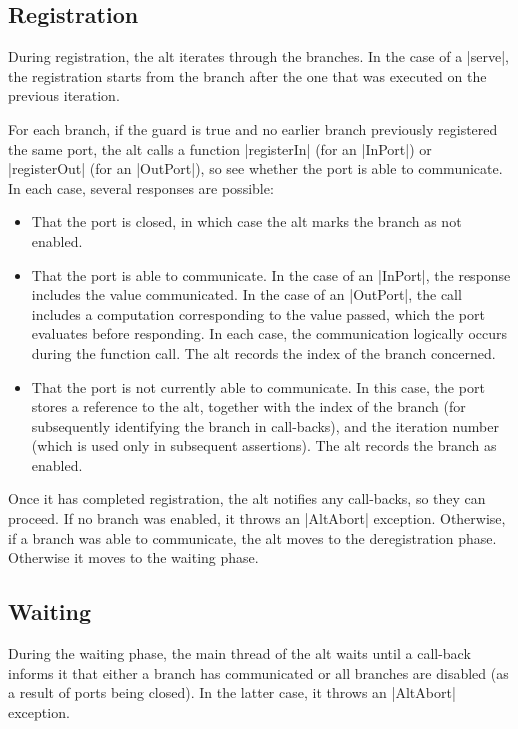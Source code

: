 \documentclass[12pt,a4paper]{article}
\begin{document}

\subsection*{Registration}

During registration, the alt iterates through the branches.  In the case of a
|serve|, the registration starts from the branch after the one that was
executed on the previous iteration. 

For each branch, if the guard is true and no earlier branch previously
registered the same port, the alt calls a function |registerIn| (for an
|InPort|) or |registerOut| (for an |OutPort|), so see whether the port is able
to communicate.  In each case, several responses are possible:
%
\begin{itemize}
\item That the port is closed, in which case the alt marks the branch as not
  enabled.

\item That the port is able to communicate.  In the case of an |InPort|, the
  response includes the value communicated.  In the case of an |OutPort|, the
  call includes a computation corresponding to the value passed, which the
  port evaluates before responding.  In each case, the communication logically
  occurs during the function call.  The alt records the index of the branch
  concerned.

\item That the port is not currently able to communicate.  In this case, the
  port stores a reference to the alt, together with the index of the branch
  (for subsequently identifying the branch in call-backs), and the iteration
  number (which is used only in subsequent assertions).  The alt records the
  branch as enabled.
\end{itemize}

Once it has completed registration, the alt notifies any call-backs, so they
can proceed.
%
If no branch was enabled, it throws an |AltAbort| exception.  Otherwise,
if a branch was able to communicate, the alt moves to the deregistration
phase.  Otherwise it moves to the waiting phase.


\subsection*{Waiting}

During the waiting phase, the main thread of the alt waits until a call-back
informs it that either a branch has communicated or all branches are disabled
(as a result of ports being closed).  In the latter case, it throws an
|AltAbort| exception.
\end{document}
